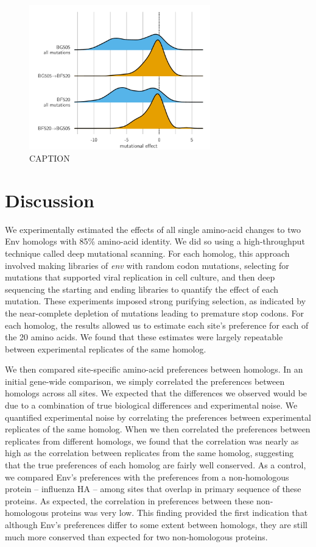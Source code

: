 \documentclass[9pt,lineno]{elife}
\begin{document}
\begin{figure}
\centerline{\includegraphics[clip=true, trim=0in 0in 0in 0.7in, width=0.7\textwidth]{figures/entrenchment.pdf}}
\caption{\label{fig:entrenchment}
CAPTION
}
\end{figure}


\section{Discussion}
We experimentally estimated the effects of all single amino-acid changes to two Env homologs with 85\% amino-acid identity.
We did so using a high-throughput technique called deep mutational scanning.
For each homolog, this approach involved making libraries of \textit{env} with random codon mutations, selecting for mutations that supported viral replication in cell culture, and then deep sequencing the starting and ending libraries to quantify the effect of each mutation.
These experiments imposed strong purifying selection, as indicated by the near-complete depletion of mutations leading to premature stop codons.
For each homolog, the results allowed us to estimate each site's preference for each of the 20 amino acids.
We found that these estimates were largely repeatable between experimental replicates of the same homolog.

We then compared site-specific amino-acid preferences between homologs.
In an initial gene-wide comparison, we simply correlated the preferences between homologs across all sites.
We expected that the differences we observed would be due to a combination of true biological differences and experimental noise.
We quantified experimental noise by correlating the preferences between experimental replicates of the same homolog.
When we then correlated the preferences between replicates from different homologs, we found that the correlation was nearly as high as the correlation between replicates from the same homolog, suggesting that the true preferences of each homolog are fairly well conserved.
As a control, we compared Env's preferences with the preferences from a non-homologous protein -- influenza HA -- among sites that overlap in primary sequence of these proteins.
As expected, the correlation in preferences between these non-homologous proteins was very low.
This finding provided the first indication that although Env's preferences differ to some extent between homologs, they are still much more conserved than expected for two non-homologous proteins.
\end{document}
